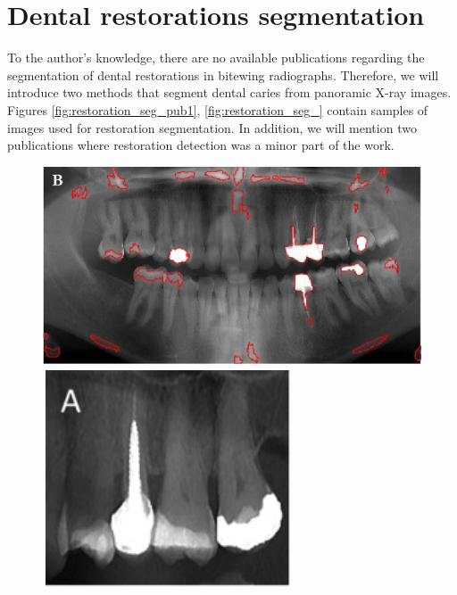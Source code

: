 \section{Dental restorations segmentation}
\label{sec:related_works:dental_restorations}
To the author's knowledge, there are no available publications regarding the segmentation of dental restorations in bitewing radiographs. Therefore, we will introduce two methods that segment dental caries from panoramic X-ray images. Figures \ref{fig:restoration_seg_pub1}, \ref{fig:restoration_seg_} contain samples of images used for restoration segmentation.
In addition, we will mention two publications where restoration detection was a minor part of the work.
\begin{figure}
    \begin{floatrow}[2]
        {\includegraphics[width=\linewidth]{images/segmentation_opg.png}}\;
        {\includegraphics[width=\linewidth]{images/segmentation_crop.png}}
    \end{floatrow}
\end{figure}
